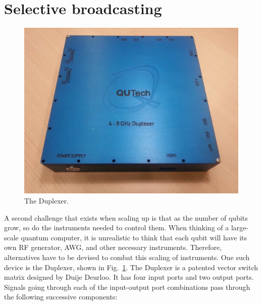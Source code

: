     \section{Selective broadcasting}
      \label{sec:selective broadcasting using the Duplexer}
      \begin{figure}
        \begin{center}
        \vspace{-30pt}
          \includegraphics[width=\textwidth]{Figures/Duplexer_with_background.png}
        \end{center}
        \vspace{-5pt}
        \caption{The Duplexer.}
        \label{fig:Duplexer picture}
        \vspace{-10pt}
      \end{figure}

      A second challenge that exists when scaling up is that as the number of qubits grow, so do the instruments needed to control them. When thinking of a large-scale quantum computer, it is unrealistic to think that each qubit will have its own RF generator, AWG, and other necessary instruments. Therefore, alternatives have to be devised to combat this scaling of instruments. One such device is the Duplexer, shown in Fig.~\ref{fig:Duplexer picture}. The Duplexer is a patented vector switch matrix designed by Duije Deurloo. It has four input ports and two output ports. Signals going through each of the input-output port combinations pass through the following successive components:

